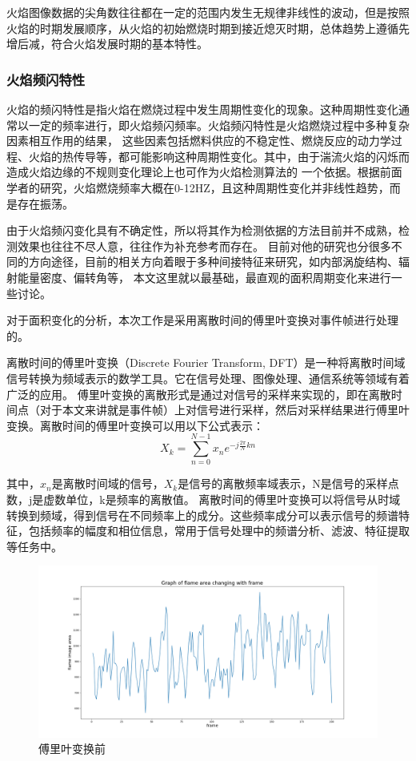 火焰图像数据的尖角数往往都在一定的范围内发生无规律非线性的波动，但是按照火焰的时期发展顺序，从火焰的初始燃烧时期到接近熄灭时期，总体趋势上遵循先增后减，符合火焰发展时期的基本特性。

\subsubsection{火焰频闪特性}
火焰的频闪特性是指火焰在燃烧过程中发生周期性变化的现象。这种周期性变化通常以一定的频率进行，即火焰频闪频率。火焰频闪特性是火焰燃烧过程中多种复杂因素相互作用的结果，
这些因素包括燃料供应的不稳定性、燃烧反应的动力学过程、火焰的热传导等，都可能影响这种周期性变化。其中，由于湍流火焰的闪烁而造成火焰边缘的不规则变化理论上也可作为火焰检测算法的
一个依据。根据前面学者的研究，火焰燃烧频率大概在0-12HZ，且这种周期性变化并非线性趋势，而是存在振荡。

由于火焰频闪变化具有不确定性，所以将其作为检测依据的方法目前并不成熟，检测效果也往往不尽人意，往往作为补充参考而存在。
目前对他的研究也分很多不同的方向途径，目前的相关方向着眼于多种间接特征来研究，如内部涡旋结构、辐射能量密度、偏转角等，
本文这里就以最基础，最直观的面积周期变化来进行一些讨论。

对于面积变化的分析，本次工作是采用离散时间的傅里叶变换对事件帧进行处理的。

离散时间的傅里叶变换（Discrete Fourier Transform, DFT）\cite{fly}是一种将离散时间域信号转换为频域表示的数学工具。它在信号处理、图像处理、通信系统等领域有着广泛的应用。
傅里叶变换的离散形式是通过对信号的采样来实现的，即在离散时间点（对于本文来讲就是事件帧）上对信号进行采样，然后对采样结果进行傅里叶变换。离散时间的傅里叶变换可以用以下公式表示：
\begin{equation} 
    X_k=\sum_{n=0}^{N-1}x_n e^{-j\frac{2\pi}{N}kn}
\end{equation}

其中，$x_n$是离散时间域的信号，$X_k$是信号的离散频率域表示，N是信号的采样点数，j是虚数单位，k是频率的离散值。
离散时间的傅里叶变换可以将信号从时域转换到频域，得到信号在不同频率上的成分。这些频率成分可以表示信号的频谱特征，包括频率的幅度和相位信息，常用于信号处理中的频谱分析、滤波、特征提取等任务中。

\begin{figure}[ht]
  \centering
  \includegraphics[width=\textwidth]{figures/extract_flicker_01.png}
  \caption{傅里叶变换前}
  \label{8}
\end{figure}


